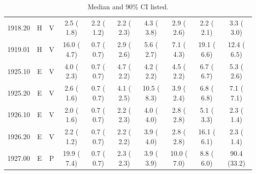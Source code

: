 \documentclass[11pt,twocolumn]{article}
\begin{document}
\begin{table}[]
{\begin{tabular}{cccccccccc}
1918.20 & H & V &  2.5 ( 1.8) &  2.2 ( 1.2) &  2.2 ( 2.3) &  4.3 ( 3.8) &  2.9 ( 2.6) &  2.2 ( 2.1) &  3.3 ( 3.0)  \\
1919.01 & H & V & 16.0 ( 4.7) &  0.7 ( 0.7) &  2.9 ( 2.6) &  5.6 ( 2.7) &  7.1 ( 4.3) & 19.1 ( 6.6) & 12.4 ( 6.5)  \\
1925.10 & E & V &  4.0 ( 2.3) &  0.7 ( 0.7) &  4.7 ( 2.2) &  4.2 ( 2.2) &  4.5 ( 2.2) &  6.7 ( 6.7) &  5.3 ( 2.6)  \\
1925.20 & E & V &  2.6 ( 1.6) &  0.7 ( 0.7) &  4.1 ( 2.5) & 10.5 ( 8.3) &  3.9 ( 2.4) &  6.8 ( 6.8) &  7.1 ( 7.1)  \\
1926.10 & E & V &  2.0 ( 1.6) &  0.7 ( 0.7) &  2.2 ( 2.3) &  4.0 ( 4.0) &  2.8 ( 2.8) &  5.1 ( 3.3) &  2.3 ( 1.4)  \\
1926.20 & E & V &  2.2 ( 1.2) &  0.7 ( 0.7) &  2.2 ( 2.2) &  3.9 ( 4.0) &  2.8 ( 2.8) & 16.1 ( 6.1) &  2.3 ( 1.4)  \\
1927.00 & E & P & 19.9 ( 7.4) &  0.7 ( 0.7) &  2.3 ( 2.3) &  3.9 ( 3.9) & 10.0 ( 7.0) &  8.8 ( 6.0) & 90.4 (33.2)\\ 
\bottomrule
\end{tabular}
}
\caption*{Median and 90\% CI listed.}
\label{tbl:allPop}
\end{table}

\end{document}
